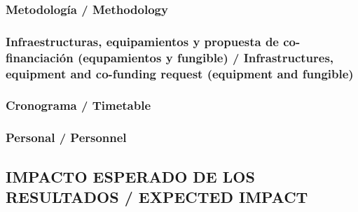 \documentclass[a4paper,11pt,oneside]{article}
\begin{document}
\subsubsection{Metodolog\'ia / Methodology}
 
 
 
 

\subsubsection{Infraestructuras, equipamientos y propuesta de co-financiaci\'on (equpamientos y fungible) / Infrastructures, equipment and co-funding request (equipment and fungible)}



\subsubsection{Cronograma / Timetable}



\subsubsection{Personal / Personnel}



\subsection{IMPACTO ESPERADO DE LOS RESULTADOS / EXPECTED IMPACT}

%
%
%
%
\end{document}
